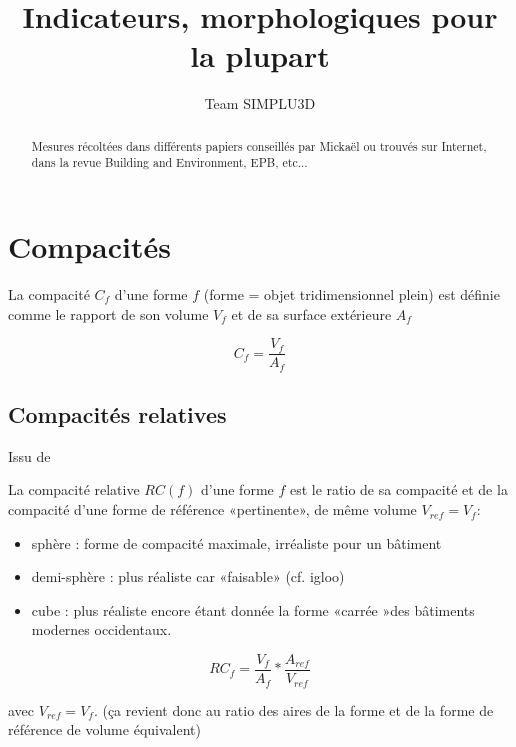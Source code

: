 \documentclass[[a4paper, 11pt]{article}
\begin{document}
%
\title{Indicateurs, morphologiques pour la plupart}
%
%
\author{Team SIMPLU3D}
%

%
\maketitle              %
%
\begin{abstract}
Mesures récoltées dans différents papiers conseillés par Mickaël ou trouvés sur Internet, dans la revue Building and Environment, EPB, etc...	  
\end{abstract}
%
%
%
\section{Compacités}

La compacité $C_f$ d'une forme $f$ (forme = objet tridimensionnel plein) est définie comme le rapport de son volume $V_f$  et de sa surface extérieure $A_f$

\begin{equation}
C_f= \frac{V_f}{A_f}
\end{equation}



\subsection{Compacités relatives} %
\label{subsec:compacités_relatives}
Issu de \cite{pessenlehner_building_2003}


La compacité relative $RC(f)$ d'une forme $f$ est le ratio de sa compacité et de la compacité d'une forme de référence «pertinente», de même volume $V_{ref}=V_f$: 
\begin{itemize}
	\item sphère :  forme de compacité maximale, irréaliste pour un bâtiment
	\item demi-sphère : plus réaliste car «faisable» (cf. igloo)
	\item cube : plus réaliste encore étant donnée la forme «carrée »des bâtiments modernes occidentaux. 
\end{itemize}


\begin{equation}
RC_f= \frac{V_f}{A_f}*\frac{A_{ref}}{V_{ref}}
\end{equation}

avec $V_{ref}=V_f$. (ça revient donc au ratio des aires de la forme et de la forme de référence de volume équivalent)
\end{document}
